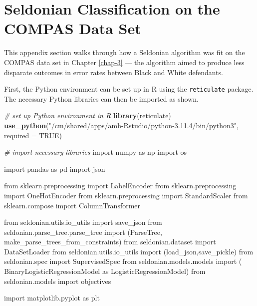\documentclass[12pt, twoside]{amherstthesis}
\newenvironment{Shaded}{\begin{snugshade}}{\end{snugshade}}
\newcommand{\AttributeTok}[1]{\textcolor[rgb]{0.13,0.29,0.53}{#1}}
\newcommand{\CommentTok}[1]{\textcolor[rgb]{0.56,0.35,0.01}{\textit{#1}}}
\newcommand{\ConstantTok}[1]{\textcolor[rgb]{0.56,0.35,0.01}{#1}}
\newcommand{\FunctionTok}[1]{\textcolor[rgb]{0.13,0.29,0.53}{\textbf{#1}}}
\newcommand{\ImportTok}[1]{#1}
\newcommand{\NormalTok}[1]{#1}
\newcommand{\StringTok}[1]{\textcolor[rgb]{0.31,0.60,0.02}{#1}}
\begin{document}
\hypertarget{appendix-e}{%
\chapter{Seldonian Classification on the COMPAS Data Set}\label{appendix-e}}

\noindent This appendix section walks through how a Seldonian algorithm was fit on the COMPAS data set in Chapter \ref{chap-3} --- the algorithm aimed to produce less disparate outcomes in error rates between Black and White defendants.

\noindent First, the Python environment can be set up in R using the \texttt{reticulate} package. The necessary Python libraries can then be imported as shown.
\begin{Shaded}
\begin{Highlighting}[]
\CommentTok{\# set up Python environment in R}
\FunctionTok{library}\NormalTok{(reticulate)}
\FunctionTok{use\_python}\NormalTok{(}\StringTok{"/cm/shared/apps/amh{-}Rstudio/python{-}3.11.4/bin/python3"}\NormalTok{, }
           \AttributeTok{required =} \ConstantTok{TRUE}\NormalTok{)}
\end{Highlighting}
\end{Shaded}
\begin{Shaded}
\begin{Highlighting}[]
\CommentTok{\# import necessary libraries}
\ImportTok{import}\NormalTok{ numpy }\ImportTok{as}\NormalTok{ np}
\ImportTok{import}\NormalTok{ os}

\ImportTok{import}\NormalTok{ pandas }\ImportTok{as}\NormalTok{ pd}
\ImportTok{import}\NormalTok{ json}

\ImportTok{from}\NormalTok{ sklearn.preprocessing }\ImportTok{import}\NormalTok{ LabelEncoder}
\ImportTok{from}\NormalTok{ sklearn.preprocessing }\ImportTok{import}\NormalTok{ OneHotEncoder}
\ImportTok{from}\NormalTok{ sklearn.preprocessing }\ImportTok{import}\NormalTok{ StandardScaler}
\ImportTok{from}\NormalTok{ sklearn.compose }\ImportTok{import}\NormalTok{ ColumnTransformer}

\ImportTok{from}\NormalTok{ seldonian.utils.io\_utils }\ImportTok{import}\NormalTok{ save\_json}
\ImportTok{from}\NormalTok{ seldonian.parse\_tree.parse\_tree }\ImportTok{import}\NormalTok{ (ParseTree,}
\NormalTok{    make\_parse\_trees\_from\_constraints)}
\ImportTok{from}\NormalTok{ seldonian.dataset }\ImportTok{import}\NormalTok{ DataSetLoader}
\ImportTok{from}\NormalTok{ seldonian.utils.io\_utils }\ImportTok{import}\NormalTok{ (load\_json,save\_pickle)}
\ImportTok{from}\NormalTok{ seldonian.spec }\ImportTok{import}\NormalTok{ SupervisedSpec}
\ImportTok{from}\NormalTok{ seldonian.models.models }\ImportTok{import}\NormalTok{ (}
\NormalTok{    BinaryLogisticRegressionModel }\ImportTok{as}\NormalTok{ LogisticRegressionModel) }
\ImportTok{from}\NormalTok{ seldonian.models }\ImportTok{import}\NormalTok{ objectives}

\ImportTok{import}\NormalTok{ matplotlib.pyplot }\ImportTok{as}\NormalTok{ plt}
\end{Highlighting}
\end{Shaded}
\end{document}
